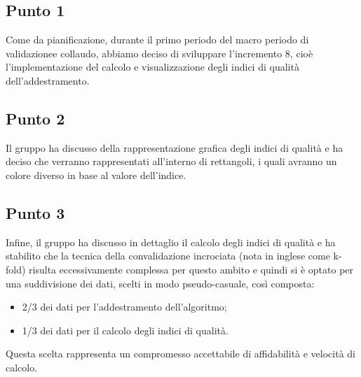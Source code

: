     \subsection{Punto 1}
     Come da pianificazione, durante il primo periodo del macro periodo di validazione\glosp e collaudo, abbiamo deciso di sviluppare l'incremento 8, cioè l'implementazione del calcolo e visualizzazione degli indici di qualità dell'addestramento.
    \subsection{Punto 2}
    Il gruppo ha discusso della rappresentazione grafica degli indici di qualità e ha deciso che verranno rappresentati all'interno di rettangoli, i quali avranno un colore diverso in base al valore dell'indice.
    \subsection{Punto 3}
    Infine, il gruppo ha discusso in dettaglio il calcolo degli indici di qualità e ha stabilito che la tecnica della convalidazione incrociata (nota in inglese come k-fold) risulta eccessivamente complessa per questo ambito e quindi si è optato per una suddivisione dei dati, scelti in modo pseudo-casuale, così composta:
    \begin{itemize}
    	\item 2/3 dei dati per l'addestramento dell'algoritmo;
    	\item 1/3 dei dati per il calcolo degli indici di qualità.
    \end{itemize}
	Questa scelta rappresenta un compromesso accettabile di affidabilità e velocità di calcolo.
        